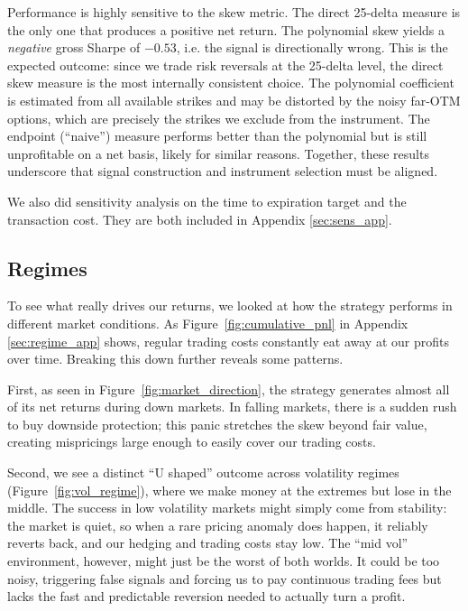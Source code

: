 \documentclass[12pt, a4paper]{article}
\begin{document}
Performance is highly sensitive to the skew metric. The direct 25-delta measure is the only one that produces a positive net return. The polynomial skew yields a \emph{negative} gross Sharpe of $-0.53$, i.e. the signal is directionally wrong. This is the expected outcome: since we trade risk reversals at the 25-delta level, the direct skew measure is the most internally consistent choice. The polynomial coefficient is estimated from all available strikes and may be distorted by the noisy far-OTM options, which are precisely the strikes we exclude from the instrument. The endpoint (``naive'') measure performs better than the polynomial but is still unprofitable on a net basis, likely for similar reasons. Together, these results underscore that signal construction and instrument selection must be aligned.

We also did sensitivity analysis on the time to expiration target and the transaction cost. They are both included in Appendix \ref{sec:sens_app}.

\subsection{Regimes}
\label{sec:regimes}
To see what really drives our returns, we looked at how the strategy performs in different market conditions. As Figure~\ref{fig:cumulative_pnl} in Appendix \ref{sec:regime_app} shows, regular trading costs constantly eat away at our profits over time. Breaking this down further reveals some patterns. 

First, as seen in Figure~\ref{fig:market_direction}, the strategy generates almost all of its net returns during down markets. In falling markets, there is a sudden rush to buy downside protection; this panic stretches the skew beyond fair value, creating mispricings large enough to easily cover our trading costs.

Second, we see a distinct ``U shaped'' outcome across volatility regimes (Figure~\ref{fig:vol_regime}), where we make money at the extremes but lose in the middle. The success in low volatility markets might simply come from stability: the market is quiet, so when a rare pricing anomaly does happen, it reliably reverts back, and our hedging and trading costs stay low. The ``mid vol'' environment, however, might just be the worst of both worlds. It could be too noisy, triggering false signals and forcing us to pay continuous trading fees but lacks the fast and predictable reversion needed to actually turn a profit. 
\end{document}
